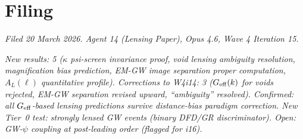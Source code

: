 \documentclass[11pt,a4paper]{article}
\newcommand{\Geff}{G_{\rm eff}}
\begin{document}
\section*{Filing}

\textit{Filed 20 March 2026.  Agent 14 (Lensing Paper),
Opus 4.6, Wave 4 Iteration 15.}

\textit{New results: 5 ($\kappa$ psi-screen invariance proof,
void lensing ambiguity resolution, magnification bias prediction,
EM-GW image separation proper computation, $A_L(\ell)$ quantitative
profile).  Corrections to W4i14: 3 ($\Geff(k)$ for voids rejected,
EM-GW separation revised upward, ``ambiguity'' resolved).
Confirmed: all $\Geff$-based lensing predictions survive distance-bias
paradigm correction.  New Tier~0 test: strongly lensed GW events
(binary DFD/GR discriminator).  Open: GW-$\psi$ coupling at
post-leading order (flagged for i16).}
\end{document}
